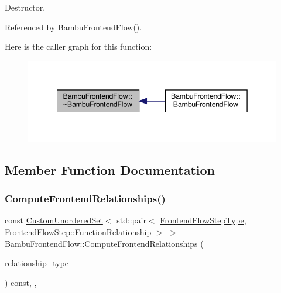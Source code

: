 Destructor. 



Referenced by Bambu\+Frontend\+Flow().

Here is the caller graph for this function\+:
\nopagebreak
\begin{figure}[H]
\begin{center}
\leavevmode
\includegraphics[width=342pt]{d8/d88/classBambuFrontendFlow_a6e84fa876caa91819720abd15fbf121c_icgraph}
\end{center}
\end{figure}


\subsection{Member Function Documentation}
\mbox{\label{classBambuFrontendFlow_af5ffc3e14700fa4cb8410cca5c886ae0}} 
\subsubsection{\texorpdfstring{Compute\+Frontend\+Relationships()}{ComputeFrontendRelationships()}}
{\footnotesize\ttfamily const \hyperlink{classCustomUnorderedSet}{Custom\+Unordered\+Set}$<$ std\+::pair$<$ \hyperlink{frontend__flow__step_8hpp_afeb3716c693d2b2e4ed3e6d04c3b63bb}{Frontend\+Flow\+Step\+Type}, \hyperlink{classFrontendFlowStep_af7cf30f2023e5b99e637dc2058289ab0}{Frontend\+Flow\+Step\+::\+Function\+Relationship} $>$ $>$ Bambu\+Frontend\+Flow\+::\+Compute\+Frontend\+Relationships (\begin{DoxyParamCaption}\item[{const \hyperlink{classDesignFlowStep_a723a3baf19ff2ceb77bc13e099d0b1b7}{Design\+Flow\+Step\+::\+Relationship\+Type}}]{relationship\+\_\+type }\end{DoxyParamCaption}) const\hspace{0.3cm}{\ttfamily [override]}, {\ttfamily [protected]}, {\ttfamily [virtual]}}



